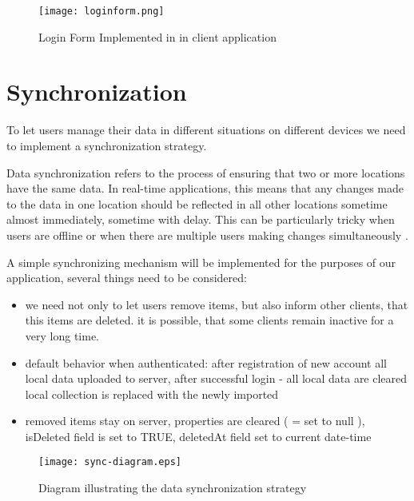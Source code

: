 \begin{figure}[H]
    \centering
    \texttt{[image: loginform.png]}
    \caption[Proof-of-concept Login form]{\label{fig:loginform} Login Form Implemented in in client application }
\end{figure}


\section{{Synchronization}}%
\label{sec:synchronization}

To let users manage their data in different situations on different devices we need to implement a synchronization strategy. 

Data synchronization refers to the process of ensuring that two or more locations have the same data. In real-time applications, this means that any changes made to the data in one location should be reflected in all other locations sometime almost immediately, sometime with delay. This can be particularly tricky when users are offline or when there are multiple users making changes simultaneously \autocite{SyncPeerDH}.

A simple synchronizing mechanism will be implemented for the purposes of our application, several things need to be considered:
\begin{itemize}
    \item we need not only to let users remove items, but also inform other clients, that this items are deleted. it is possible, that some clients remain inactive for a very long time.
    \item default behavior when authenticated: after registration of new account all local data uploaded to server, after successful login - all local data are cleared local collection is replaced with the newly imported
    \item removed items stay on server, properties are cleared ( = set to null ), isDeleted field is set to TRUE, deletedAt field set to current date-time
\end{itemize}

\begin{figure}[H]
    \centering
    \texttt{[image: sync-diagram.eps]}
    \caption[Synchronization strategy diagram]{\label{fig:syncdiagram} Diagram illustrating the data synchronization strategy  }
\end{figure}


